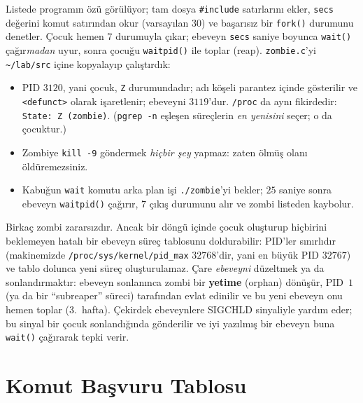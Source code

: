 \documentclass[11pt,a4paper]{article}
\newcommand{\term}[1]{\textbf{\color{mintdeep}#1}}
\newcommand{\cmd}[1]{\texttt{#1}}
\begin{document}


Listede programın özü görülüyor; tam dosya \texttt{\#include} satırlarını ekler, \texttt{secs} değerini komut satırından okur (varsayılan $30$) ve başarısız bir \cmd{fork()} durumunu denetler. Çocuk hemen $7$ durumuyla çıkar; ebeveyn \texttt{secs} saniye boyunca \cmd{wait()} çağır\emph{madan} uyur, sonra çocuğu \cmd{waitpid()} ile toplar (reap). \texttt{zombie.c}'yi \texttt{\textasciitilde/lab/src} içine kopyalayıp çalıştırdık:



\begin{itemize}
  \item PID $3120$, yani çocuk, \texttt{Z} durumundadır; adı köşeli parantez içinde gösterilir ve \texttt{<defunct>} olarak işaretlenir; ebeveyni $3119$'dur. \texttt{/proc} da aynı fikirdedir: \texttt{State: Z (zombie)}. (\cmd{pgrep -n} eşleşen süreçlerin \emph{en yenisini} seçer; o da çocuktur.)
  \item Zombiye \cmd{kill -9} göndermek \emph{hiçbir şey} yapmaz: zaten ölmüş olanı öldüremezsiniz.
  \item Kabuğun \cmd{wait} komutu arka plan işi \texttt{./zombie}'yi bekler; $25$ saniye sonra ebeveyn \cmd{waitpid()} çağırır, $7$ çıkış durumunu alır ve zombi listeden kaybolur.
\end{itemize}

Birkaç zombi zararsızdır. Ancak bir döngü içinde çocuk oluşturup hiçbirini beklemeyen hatalı bir ebeveyn süreç tablosunu doldurabilir: PID'ler sınırlıdır (makinemizde \nolinkurl{/proc/sys/kernel/pid_max} $32768$'dir, yani en büyük PID $32767$) ve tablo dolunca yeni süreç oluşturulamaz. Çare \emph{ebeveyni} düzeltmek ya da sonlandırmaktır: ebeveyn sonlanınca zombi bir \term{yetime} (orphan) dönüşür, PID~$1$ (ya da bir ``subreaper'' süreci) tarafından evlat edinilir ve bu yeni ebeveyn onu hemen toplar (3.~hafta). Çekirdek ebeveynlere SIGCHLD sinyaliyle yardım eder; bu sinyal bir çocuk sonlandığında gönderilir ve iyi yazılmış bir ebeveyn buna \cmd{wait()} çağırarak tepki verir.

\section{Komut Başvuru Tablosu}
\end{document}
